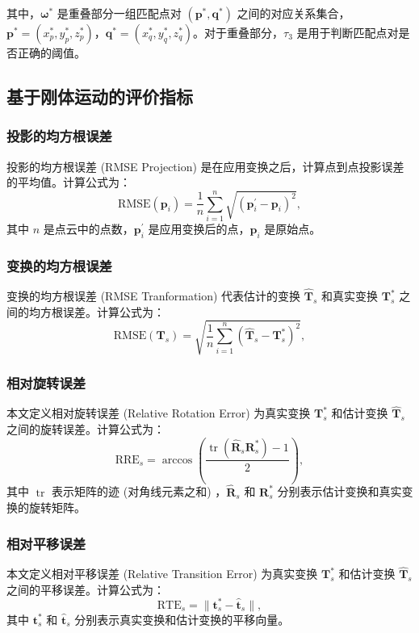 其中，$\boldsymbol{\omega}^*$ 是重叠部分一组匹配点对 $(\boldsymbol{p}^*, \boldsymbol{q}^*)$ 之间的对应关系集合，$\boldsymbol{p}^* = (x^*_p, y^*_p, z^*_p)$，$\boldsymbol{q}^* = (x^*_q, y^*_q, z^*_q)$。对于重叠部分，$\tau_3$ 是用于判断匹配点对是否正确的阈值。

\subsection{基于刚体运动的评价指标}
\subsubsection{投影的均方根误差}
投影的均方根误差 (RMSE Projection) 是在应用变换之后，计算点到点投影误差的平均值。计算公式为：
\begin{equation}
    \text{RMSE} (\boldsymbol{p}_i) = \frac{1}{n}\sum_{i=1}^{n} \sqrt{(\boldsymbol{p}_i^{'} - \boldsymbol{p}_i)^2},
\end{equation}
其中 $n$ 是点云中的点数，$\boldsymbol{p}_i^{'}$ 是应用变换后的点，$\boldsymbol{p}_i$ 是原始点。

\subsubsection{变换的均方根误差}
变换的均方根误差 (RMSE Tranformation) 代表估计的变换 $\boldsymbol{\hat{T}}_{s}$ 和真实变换 $\boldsymbol{T}^*_{s}$ 之间的均方根误差。计算公式为：
\begin{equation}
    \text{RMSE} (\boldsymbol{T}_s) = \sqrt{\frac{1}{n}\sum_{i=1}^{n}(\boldsymbol{\hat{T}}_{s} - \boldsymbol{T}^*_{s})^2},
\end{equation}

\subsubsection{相对旋转误差}
本文定义相对旋转误差 (Relative Rotation Error) 为真实变换 $\boldsymbol{T}^*_{s}$ 和估计变换 $\boldsymbol{\hat{T}}_{s}$ 之间的旋转误差。计算公式为：
\begin{equation}
    \text{RRE}_s = \arccos \left(\frac{\operatorname{tr}(\boldsymbol{\hat{R}}_{s} \boldsymbol{R}^*_s) - 1}{2}\right),
\end{equation}
其中 $\operatorname{tr}$ 表示矩阵的迹 (对角线元素之和) ，$\boldsymbol{\hat{R}}_{s}$ 和 $\boldsymbol{R}^*_s$ 分别表示估计变换和真实变换的旋转矩阵。

\subsubsection{相对平移误差}
本文定义相对平移误差 (Relative Transition Error) 为真实变换 $\boldsymbol{T}^*_s$ 和估计变换 $\boldsymbol{\hat{T}}_{s}$ 之间的平移误差。计算公式为：
\begin{equation}
    \text{RTE}_s = \lVert \boldsymbol{t}^*_s - \boldsymbol{\hat{t}}_{s} \rVert,
\end{equation}
其中 $\boldsymbol{t}^*_s$ 和 $\boldsymbol{\hat{t}}_{s}$ 分别表示真实变换和估计变换的平移向量。


